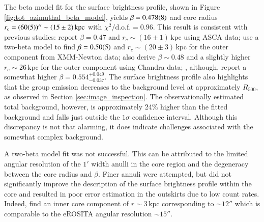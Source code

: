 The beta model fit for the surface brightness profile, shown in Figure \ref{fig:tot_azimuthal_beta_model}, yields \(\beta = \num{0.478\pm0.008}\) and core radius \(r_c = (\num{60\pm5})'' \sim (15\pm2)\,\text{kpc}\) with \(\chi^2/\text{d.o.f.} = 0.96\). This result is consistent with previous studies: \cite{Kawaharada_2003} report \(\beta = 0.47\) and \(r_c \sim (16\pm1)\,\text{kpc}\) using ASCA data; \cite{Kawaharada_2009} use a two-beta model to find \(\beta = \num{0.50\pm0.05}\) and \(r_c \sim (20\pm3)\,\text{kpc}\) for the outer component from XMM-Newton data; \cite{Sun_2003} also derive \(\beta \sim 0.48\) and a slightly higher \(r_c \sim 26\,\text{kpc}\) for the outer component using Chandra data; \cite{Reiprich_2002}, although, report a somewhat higher \(\beta = 0.554^{+0.049}_{-0.037}\). The surface brightness profile also highlights that the group emission decreases to the background level at approximately \(R_{500}\), as observed in Section \ref{sec:image_inspection}. The observationally estimated total background, however, is approximately 24\% higher than the fitted background and falls just outside the \(1\sigma\) confidence interval. Although this discrepancy is not that alarming, it does indicate challenges associated with the somewhat complex background. 

A two-beta model fit was not successful. This can be attributed to the limited angular resolution of the \(1'\) width anulli in the core region and the degeneracy between the core radius and \(\beta\). Finer annuli were attempted, but did not significantly improve the description of the surface brightness profile within the core and resulted in poor error estimation in the outskirts due to low count rates. Indeed, \cite{Kawaharada_2009} find an inner core component of \(r \sim 3\,\text{kpc}\) corresponding to \(\sim 12'' \) which is comparable to the eROSITA angular resolution \(\sim 15''\).
